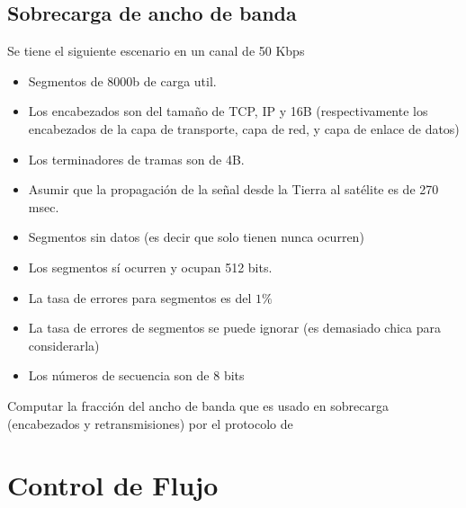 \documentclass[12pt]{report}
\begin{document}
\begin{exer}
\subsection{Sobrecarga de ancho de banda \sthree \shard}
Se tiene el siguiente escenario en un canal de 50 Kbps

\begin{itemize}
\item Segmentos de 8000b de carga util.
\item Los encabezados son del tamaño de TCP, IP y 16B (respectivamente los encabezados de la capa de transporte, capa de red, y capa de enlace de datos)
\item Los terminadores de tramas son de 4B.
\item  Asumir que la propagación de la señal desde la Tierra al satélite es de 270 msec.
\item Segmentos sin datos (es decir que solo tienen  nunca ocurren)
\item Los segmentos  sí ocurren y ocupan 512 bits.
\item La tasa de errores para segmentos es del $1\%$
\item La tasa de errores de segmentos  se puede ignorar (es demasiado chica para considerarla)
\item Los números de secuencia son de 8 bits
\end{itemize}

Computar la fracción del ancho de banda que es usado en sobrecarga
(encabezados y retransmisiones) por el protocolo de 
\end{exer}

\section{Control de Flujo}
\end{document}
